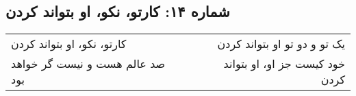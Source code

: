 \begin{center}
\section*{شماره ۱۴: کارتو، نکو، او بتواند کردن}
\label{sec:014}
\begin{longtable}{l p{0.5cm} r}
کارتو، نکو، او بتواند کردن
&&
یک تو و دو تو او بتواند کردن
\\
صد عالم هست و نیست گر خواهد بود
&&
خود کیست جز او، او بتواند کردن
\\
\end{longtable}
\end{center}
